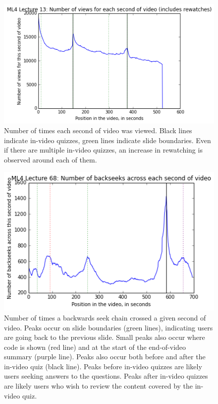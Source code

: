 \documentclass[letterpaper]{article}
\begin{document}
\begin{figure}
\includegraphics[width=1.0\columnwidth]{watched13}
\caption{Number of times each second of video was viewed. Black lines indicate in-video quizzes, green lines indicate slide boundaries. Even if there are multiple in-video quizzes, an increase in rewatching is observed around each of them.}
\label{fig:watched13}
\end{figure}

\begin{figure}
\includegraphics[width=1.0\columnwidth]{backseeks}
\caption{Number of times a backwards seek chain crossed a given second of video. Peaks occur on slide boundaries (green lines), indicating users are going back to the previous slide. Small peaks also occur where code is shown (red line) and at the start of the end-of-video summary (purple line). Peaks also occur both before and after the in-video quiz (black line). Peaks before in-video quizzes are likely users seeking answers to the questions. Peaks after in-video quizzes are likely users who wish to review the content covered by the in-video quiz.}
\label{fig:backseeks}
\end{figure}
\end{document}
